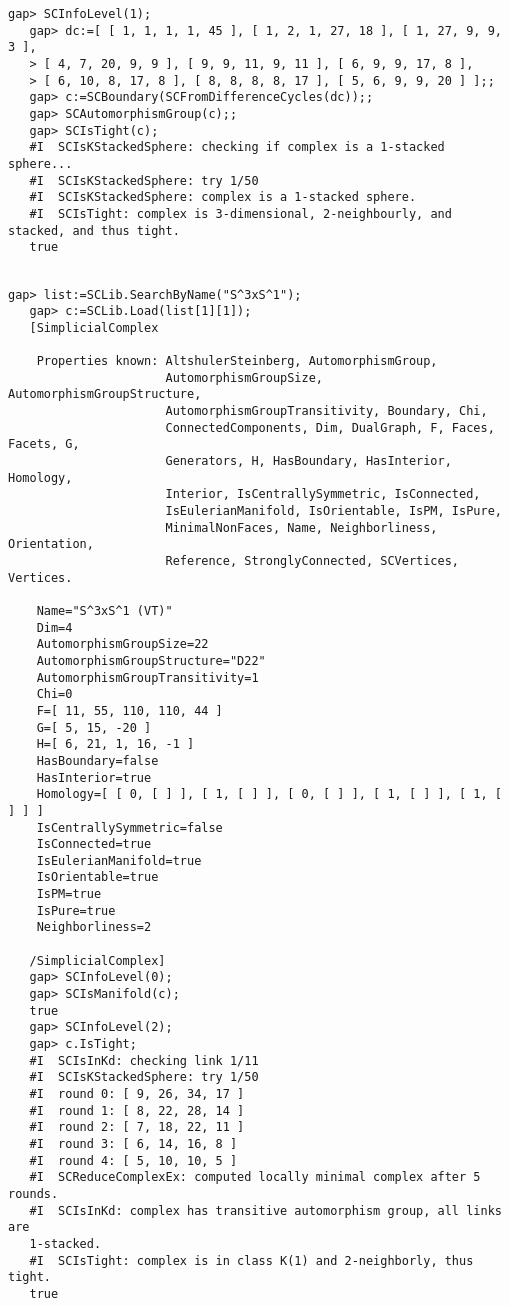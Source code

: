 \documentclass[a4paper,11pt]{report}
\begin{document}
{{{\begin{Verbatim}[commandchars=!@|,fontsize=\small,frame=single,label=Example]
   gap> SCInfoLevel(1);
   gap> dc:=[ [ 1, 1, 1, 1, 45 ], [ 1, 2, 1, 27, 18 ], [ 1, 27, 9, 9, 3 ], 
   > [ 4, 7, 20, 9, 9 ], [ 9, 9, 11, 9, 11 ], [ 6, 9, 9, 17, 8 ], 
   > [ 6, 10, 8, 17, 8 ], [ 8, 8, 8, 8, 17 ], [ 5, 6, 9, 9, 20 ] ];;
   gap> c:=SCBoundary(SCFromDifferenceCycles(dc));;
   gap> SCAutomorphismGroup(c);;
   gap> SCIsTight(c);
   #I  SCIsKStackedSphere: checking if complex is a 1-stacked sphere...
   #I  SCIsKStackedSphere: try 1/50
   #I  SCIsKStackedSphere: complex is a 1-stacked sphere.
   #I  SCIsTight: complex is 3-dimensional, 2-neighbourly, and stacked, and thus tight.
   true
   
\end{Verbatim}
 
\begin{Verbatim}[commandchars=!@|,fontsize=\small,frame=single,label=Example]
   gap> list:=SCLib.SearchByName("S^3xS^1");
   gap> c:=SCLib.Load(list[1][1]);           
   [SimplicialComplex
   
    Properties known: AltshulerSteinberg, AutomorphismGroup, 
                      AutomorphismGroupSize, AutomorphismGroupStructure, 
                      AutomorphismGroupTransitivity, Boundary, Chi, 
                      ConnectedComponents, Dim, DualGraph, F, Faces, Facets, G, 
                      Generators, H, HasBoundary, HasInterior, Homology, 
                      Interior, IsCentrallySymmetric, IsConnected, 
                      IsEulerianManifold, IsOrientable, IsPM, IsPure, 
                      MinimalNonFaces, Name, Neighborliness, Orientation, 
                      Reference, StronglyConnected, SCVertices, Vertices.
   
    Name="S^3xS^1 (VT)"
    Dim=4
    AutomorphismGroupSize=22
    AutomorphismGroupStructure="D22"
    AutomorphismGroupTransitivity=1
    Chi=0
    F=[ 11, 55, 110, 110, 44 ]
    G=[ 5, 15, -20 ]
    H=[ 6, 21, 1, 16, -1 ]
    HasBoundary=false
    HasInterior=true
    Homology=[ [ 0, [ ] ], [ 1, [ ] ], [ 0, [ ] ], [ 1, [ ] ], [ 1, [ ] ] ]
    IsCentrallySymmetric=false
    IsConnected=true
    IsEulerianManifold=true
    IsOrientable=true
    IsPM=true
    IsPure=true
    Neighborliness=2
   
   /SimplicialComplex]
   gap> SCInfoLevel(0);
   gap> SCIsManifold(c);
   true
   gap> SCInfoLevel(2); 
   gap> c.IsTight;                
   #I  SCIsInKd: checking link 1/11
   #I  SCIsKStackedSphere: try 1/50
   #I  round 0: [ 9, 26, 34, 17 ]
   #I  round 1: [ 8, 22, 28, 14 ]
   #I  round 2: [ 7, 18, 22, 11 ]
   #I  round 3: [ 6, 14, 16, 8 ]
   #I  round 4: [ 5, 10, 10, 5 ]
   #I  SCReduceComplexEx: computed locally minimal complex after 5 rounds.
   #I  SCIsInKd: complex has transitive automorphism group, all links are 
   1-stacked.
   #I  SCIsTight: complex is in class K(1) and 2-neighborly, thus tight.
   true
   

\end{Verbatim}}}}
\end{document}
